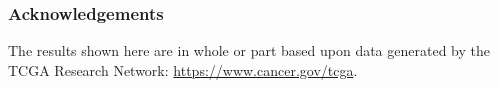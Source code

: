 \subsubsection*{Acknowledgements}

The results shown here are in whole or part based upon data generated by the TCGA Research Network: \url{https://www.cancer.gov/tcga}.
